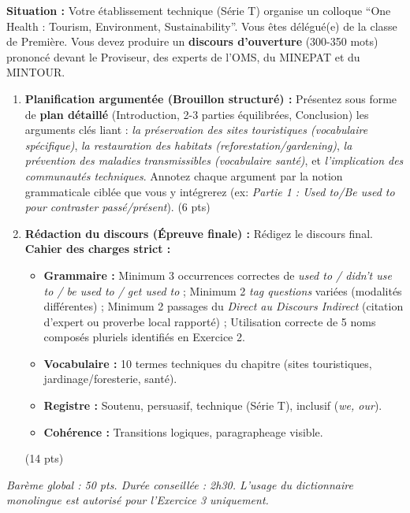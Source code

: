 \documentclass[11pt]{article}
\begin{document}
\begin{exercice}
\textbf{Situation :} Votre établissement technique (Série T) organise un colloque ``One Health : Tourism, Environment, Sustainability''. Vous êtes délégué(e) de la classe de Première. Vous devez produire un \textbf{discours d'ouverture} (300-350 mots) prononcé devant le Proviseur, des experts de l'OMS, du MINEPAT et du MINTOUR.

\begin{enumerate}
    \item \textbf{Planification argumentée (Brouillon structuré) :} Présentez sous forme de \textbf{plan détaillé} (Introduction, 2-3 parties équilibrées, Conclusion) les arguments clés liant : \textit{la préservation des sites touristiques (vocabulaire spécifique)}, \textit{la restauration des habitats (reforestation/gardening)}, \textit{la prévention des maladies transmissibles (vocabulaire santé)}, et \textit{l'implication des communautés techniques}. Annotez chaque argument par la notion grammaticale ciblée que vous y intégrerez (ex: \textit{Partie 1 : Used to/Be used to pour contraster passé/présent}). (6 pts)
    \item \textbf{Rédaction du discours (Épreuve finale) :} Rédigez le discours final. \textbf{Cahier des charges strict :}
    \begin{itemize}
        \item \textbf{Grammaire :} Minimum 3 occurrences correctes de \textit{used to / didn't use to / be used to / get used to} ; Minimum 2 \textit{tag questions} variées (modalités différentes) ; Minimum 2 passages du \textit{Direct au Discours Indirect} (citation d'expert ou proverbe local rapporté) ; Utilisation correcte de 5 noms composés pluriels identifiés en Exercice 2.
        \item \textbf{Vocabulaire :} 10 termes techniques du chapitre (sites touristiques, jardinage/foresterie, santé).
        \item \textbf{Registre :} Soutenu, persuasif, technique (Série T), inclusif (\textit{we, our}).
        \item \textbf{Cohérence :} Transitions logiques, paragrapheage visible.
    \end{itemize}
    (14 pts)
\end{enumerate}
\textit{Barème global : 50 pts. Durée conseillée : 2h30. L'usage du dictionnaire monolingue est autorisé pour l'Exercice 3 uniquement.}
\end{exercice}
\end{document}
